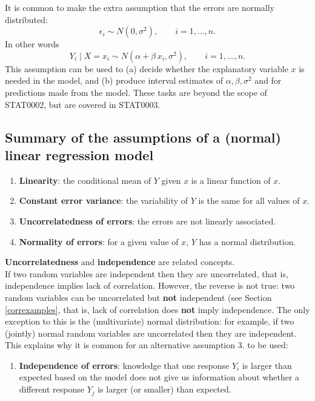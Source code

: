 \documentclass[
  british,
  11pt,
  openany, a4paper]{book}
\providecommand{\tightlist}{%
  \setlength{\itemsep}{0pt}\setlength{\parskip}{0pt}}
\begin{document}
It is common to make the extra assumption that the errors are normally distributed:
\[ \epsilon_i \sim N(0,\sigma^2), \qquad i=1,\ldots,n. \]
In other words
\[ Y_i \mid X=x_i \sim N(\alpha+\beta\,x_i,\sigma^2), \qquad i=1,\ldots,n. \]
This assumption can be used to (a) decide whether the explanatory variable \(x\) is needed in the model, and (b) produce interval estimates of \(\alpha, \beta, \sigma^2\) and for predictions made from the model. These tasks are beyond the scope of STAT0002, but are covered in STAT0003.

\subsection{Summary of the assumptions of a (normal) linear regression model}\label{lmsummary}

\begin{enumerate}
\def\labelenumi{\arabic{enumi}.}
\tightlist
\item
  \textbf{Linearity}: the conditional mean of \(Y\) given \(x\) is a linear function of \(x\).
\item
  \textbf{Constant error variance}: the variability of \(Y\) is the same for all values of \(x\).
\item
  \textbf{Uncorrelatedness of errors}: the errors are not linearly associated.
\item
  \textbf{Normality of errors}: for a given value of \(x\), \(Y\) has a normal distribution.
\end{enumerate}

\textbf{Uncorrelatedness} and \textbf{independence} are related concepts.\\
If two random variables are independent then they are uncorrelated, that is, independence implies lack of correlation. However, the reverse is not true: two random variables can be uncorrelated but \textbf{not} independent (see Section \ref{correxamples}, that is, lack of correlation does \textbf{not} imply independence. The only exception to this is the (multivariate) normal distribution: for example, if two (jointly) normal random variables are uncorrelated then they are independent. This explains why it is common for an alternative assumption 3. to be used:

\begin{enumerate}
\def\labelenumi{\arabic{enumi}.}
\setcounter{enumi}{2}
\tightlist
\item
  \textbf{Independence of errors}: knowledge that one response \(Y_i\) is larger than expected based on the model does not give us information about whether a different response \(Y_j\) is larger (or smaller) than expected.
\end{enumerate}
\end{document}
